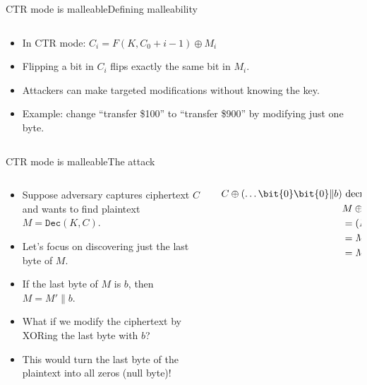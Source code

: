 \documentclass[aspectratio=169, lualatex, handout]{beamer}
\begin{document}
\begin{frame}{CTR mode is malleable}{Defining malleability}
	\begin{columns}[c]
		\begin{column}{0.5\textwidth}
			\begin{itemize}
				\item In CTR mode: $C_i = F(K, C_0 + i - 1) \oplus M_i$
				\item Flipping a bit in $C_i$ flips exactly the same bit in $M_i$.
				\item Attackers can make targeted modifications without knowing the key.
				\item Example: change ``transfer \$100'' to ``transfer \$900'' by modifying just one byte.
			\end{itemize}
		\end{column}
		\begin{column}{0.5\textwidth}
		\end{column}
	\end{columns}
\end{frame}

\begin{frame}{CTR mode is malleable}{The attack}
	\begin{columns}[c]
		\begin{column}{0.5\textwidth}
			\begin{itemize}[<+->]
				\item Suppose adversary captures ciphertext $C$ and wants to find plaintext $M = \texttt{Dec}(K, C)$.
				\item Let's focus on discovering just the last byte of $M$.
				\item If the last byte of $M$ is $b$, then $M = M' \| b$.
				\item What if we modify the ciphertext by XORing the last byte with $b$?
				\item This would turn the last byte of the plaintext into all zeros (null byte)!
			\end{itemize}
		\end{column}
		\begin{column}{0.5\textwidth}
			\begin{align*}
				C \oplus (\ldots \bit{0}\bit{0} \| b) & \text{ decrypts to:}                            \\
				                                      & M \oplus (\ldots \bit{0}\bit{0} \| b)           \\
				                                      & = (M' \| b) \oplus (\ldots \bit{0}\bit{0} \| b) \\
				                                      & = M' \| (b \oplus b)                            \\
				                                      & = M' \| \bit{0}\bit{0}
			\end{align*}
		\end{column}
	\end{columns}
\end{frame}
\end{document}
